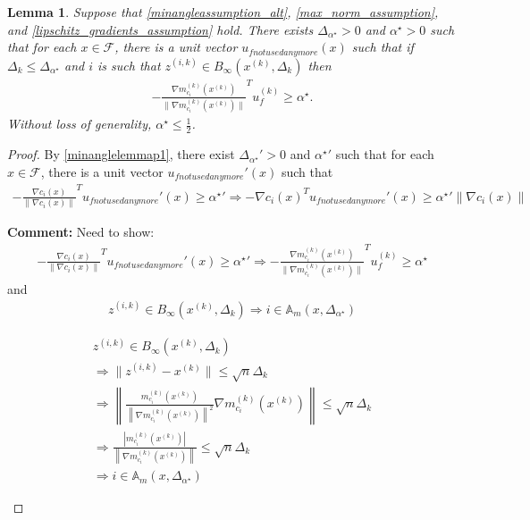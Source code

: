 \documentclass{article}
\newenvironment{comment}
  {\par\medskip
   \color{red}%
   \begin{framed}
   \textbf{Comment: }\ignorespaces}
 {\end{framed}
  \medskip}
\newtheorem{lemma}[theorem]{Lemma}
\theoremstyle{case}
\numberwithin{theorem}{subsection}
\newcommand{\dk}{\Delta_k}
\newcommand{\feasible}{{\mathcal F}}
\newcommand{\gmcik}{{\nabla m_{c_i}^{(k)}\left(\xk\right)}}
\newcommand{\minanglealpha}{{ \alpha^{\star} }}
\newcommand{\minangledelta}{{\Delta_{\alpha^{\star}}}}
\newcommand{\xk}{x^{(k)}}
\newcommand{\zik}{{z^{(i, k)}}}
\newcommand{\minangledir}{{u_{f not used anymore}}}
\newcommand{\minangledirk}{{u^{(k)}_f}}
\newcommand{\epsactivemodels}{{\mathbb A_{m}}}
\begin{document}
\color{red}
\begin{lemma}
\label{minanglelemmap2}
Suppose that \cref{minangleassumption_alt}, \cref{max_norm_assumption}, and \cref{lipschitz_gradients_assumption} hold.
There exists $\minangledelta > 0$ and $\minanglealpha > 0$ such that for each $x \in \feasible$, there is a unit vector $\minangledir(x)$ such that
if $\dk \le \minangledelta$ and $i$ is such that $\zik \in B_{\infty}(\xk, \dk)$
then
\begin{align*}
-\frac {\gmcik}{\|\gmcik\|} ^T\minangledirk \ge \minanglealpha.
\end{align*}
Without loss of generality, $\minanglealpha \le \frac 1 2$.
\end{lemma}
\begin{proof}
By \cref{minanglelemmap1}, there exist $\minangledelta' > 0$ and $\minanglealpha'$ such that for each $x \in \feasible$, 
there is a unit vector $\minangledir'(x)$ such that
\begin{align*}
-\frac {\nabla c_i(x)}{\|\nabla c_i(x)\|}^T \minangledir'(x) \ge \minanglealpha'
\Longrightarrow -\nabla c_i(x)^T \minangledir'(x) \ge \minanglealpha' \|\nabla c_i(x)\|
\end{align*}

\begin{comment}
Need to show:
\begin{align*}
-\frac {\nabla c_i(x)}{\|\nabla c_i(x)\|}^T \minangledir'(x) \ge \minanglealpha' \Longrightarrow -\frac {\gmcik}{\|\gmcik\|} ^T\minangledirk \ge \minanglealpha
\end{align*}
and
\begin{align*}
\zik \in B_{\infty}(\xk, \dk) \Longrightarrow i \in \epsactivemodels(x, \minangledelta)
\end{align*}


\begin{align*}
\zik \in B_{\infty}(\xk, \dk) \\
\Longrightarrow \|\zik - \xk\| \le \sqrt{n}\dk \\
\Longrightarrow \left\|\frac{m^{(k)}_{c_i}(\xk)}{\left\|\gmcik\right\|^2} \gmcik\right\| \le \sqrt{n}\dk \\
\Longrightarrow \frac{|m^{(k)}_{c_i}(\xk)|}{\left\|\gmcik\right\|}  \le \sqrt{n}\dk \\
\Longrightarrow i \in \epsactivemodels(x, \minangledelta)
\end{align*}

\end{comment}
\end{proof}
\color{black}
\end{document}
